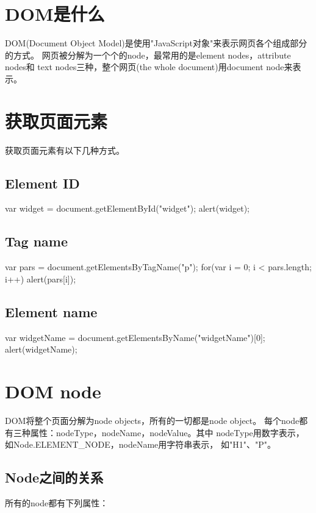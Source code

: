 \section[DOM是什么]{DOM是什么}
DOM(Document Object Model)是使用"JavaScript对象"来表示网页各个组成部分的方式。
网页被分解为一个个的node，最常用的是element nodes，attribute nodes和
text nodes三种，整个网页(the whole document)用document node来表示。

\section[获取页面元素]{获取页面元素}
获取页面元素有以下几种方式。
\subsection[Element ID]{Element ID}
\begin{javascriptcode}
  var widget = document.getElementById("widget");
  alert(widget);
\end{javascriptcode}

\subsection[Tag name]{Tag name}
\begin{javascriptcode}
  var pars = document.getElementsByTagName("p");
  for(var i = 0; i < pars.length; i++) {
    alert(pars[i]);
  }
\end{javascriptcode}

\subsection[Element name]{Element name}
\begin{javascriptcode}
  var widgetName = document.getElementsByName("widgetName")[0];
  alert(widgetName);
\end{javascriptcode}

\section[DOM node]{DOM node}
DOM将整个页面分解为node objects，所有的一切都是node object。
每个node都有三种属性：nodeType，nodeName，nodeValue。其中
nodeType用数字表示，如Node.ELEMENT\_NODE，nodeName用字符串表示，
如"H1"、"P"。

\subsection[Node之间的关系]{Node之间的关系}
所有的node都有下列属性：

